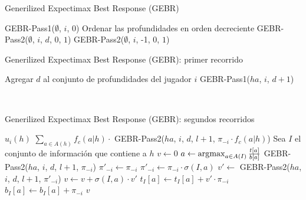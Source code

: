 \vspace{12pt}
\begin{algorithm}[H]
\caption{Generilized Expectimax Best Response (GEBR)}
\label{algorithm:GEBR}
\begin{algorithmic}[1]
        \State GEBR-Pass1($\emptyset$, $i$, $0$)
        \State Ordenar las profundidades en orden decreciente
            \State GEBR-Pass2($\emptyset$, $i$, $d$, $0$, $1$)
        \EndFor
        \State \Return GEBR-Pass2($\emptyset$, $i$, -1, $0$, $1$)
    \EndFunction
\end{algorithmic}
\end{algorithm}

\vspace{12pt}
\begin{algorithm}[H]
\caption{Generilized Expectimax Best Response (GEBR): primer recorrido}
\label{algorithm:gebr-pass1}
\begin{algorithmic}[1]
            \State \Return
        \EndIf
            \State Agregar $d$ al conjunto de profundidades del jugador $i$
        \EndIf
            \State GEBR-Pass1($ha$, $i$, $d+1$)
        \EndFor
    \EndFunction
\end{algorithmic}
\end{algorithm}

\newpage
~\vspace{1.5cm}
\begin{algorithm}[H]
\caption{Generilized Expectimax Best Response (GEBR): segundos recorridos}
\label{algorithm:gebr-pass2}
\begin{algorithmic}[1]
            \State \Return $u_i(h)$
            \State \Return $\sum_{a \in A(h)} f_c(a|h) \cdot$ GEBR-Pass2($ha$, $i$, $d$, $l+1$, $\pi_{-i} \cdot f_c(a | h)$)
        \EndIf
        \State Sea $I$ el conjunto de información que contiene a $h$
        \State $v \leftarrow 0$
            \State $a \leftarrow \operatorname*{\arg\!\max}_{a \in A(I)} \frac{t[a]}{b[a]}$
            \State \Return GEBR-Pass2($ha$, $i$, $d$, $l+1$, $\pi_{-i}$)
        \EndIf
            \State $\pi'_{-i} \leftarrow \pi_{-i}$
                \State $\pi'_{-i} \leftarrow \pi_{-i} \cdot \sigma(I, a)$
            \EndIf
            \State $v' \leftarrow $ GEBR-Pass2($ha$, $i$, $d$, $l+1$, $\pi'_{-i}$)
                \State $v \leftarrow v + \sigma(I, a) \cdot v'$
                \State $t_I[a] \leftarrow t_I[a] + v' \cdot \pi_{-i}$
                \State $b_I[a] \leftarrow b_I[a] + \pi_{-i}$
            \EndIf
        \EndFor
        \State \Return $v$
    \EndFunction
\end{algorithmic}
\end{algorithm}


